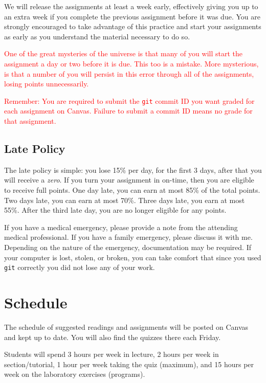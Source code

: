 \documentclass[12pt]{article}
\begin{document}
We will release the assignments at least a week early, effectively giving you up
to an extra week if you complete the previous assignment before it was due. You
are strongly encouraged to take advantage of this practice and start your
assignments as early as you understand the material necessary to do so.

\textcolor{red}{One of the great mysteries of the universe is that many of you
will start the assignment a day or two before it is due. This too is a mistake.
More mysterious, is that a number of you will persist in this error through all
of the assignments, losing points unnecessarily.}

\textcolor{red}{Remember: You are required to submit the \texttt{git} commit ID
you want graded for each assignment on Canvas. Failure to submit a commit ID
means no grade for that assignment.}

\subsection{Late Policy}

The late policy is simple: you lose 15\% per day, for the first 3 days, after
that you will receive a \emph{zero}. If you turn your assignment in on-time,
then you are eligible to receive full points. One day late, you can earn at most
85\% of the total points. Two days late, you can earn at most 70\%. Three days
late, you earn at most 55\%. After the third late day, you are no longer
eligible for any points.

\begin{center}
  
\end{center}

If you have a medical emergency, please provide a note from the attending
medical professional. If you have a family emergency, please discuss it with me.
Depending on the nature of the emergency, documentation may be required. If your
computer is lost, stolen, or broken, you can take comfort that since you used
\texttt{git} correctly you did not lose any of your work.

\section{Schedule}

The schedule of suggested readings and assignments will be posted on Canvas and
kept up to date. You will also find the quizzes there each Friday.

Students will spend 3 hours per week in lecture, 2 hours per week
in section/tutorial, 1 hour per week taking the quiz (maximum), and
15 hours per week on the laboratory exercises (programs).
\end{document}
